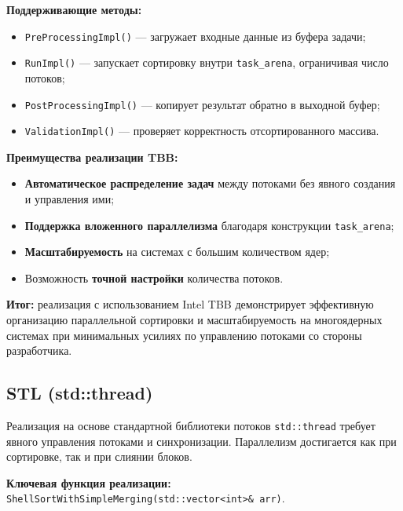 \documentclass[12pt]{article}
\begin{document}
\textbf{Поддерживающие методы:}
\begin{itemize}
  \item \texttt{PreProcessingImpl()} — загружает входные данные из буфера задачи;
  \item \texttt{RunImpl()} — запускает сортировку внутри \texttt{task\_arena}, ограничивая число потоков;
  \item \texttt{PostProcessingImpl()} — копирует результат обратно в выходной буфер;
  \item \texttt{ValidationImpl()} — проверяет корректность отсортированного массива.
\end{itemize}

\textbf{Преимущества реализации TBB:}
\begin{itemize}
  \item \textbf{Автоматическое распределение задач} между потоками без явного создания и управления ими;
  \item \textbf{Поддержка вложенного параллелизма} благодаря конструкции \texttt{task\_arena};
  \item \textbf{Масштабируемость} на системах с большим количеством ядер;
  \item Возможность \textbf{точной настройки} количества потоков.
\end{itemize}

\textbf{Итог:} реализация с использованием Intel TBB демонстрирует эффективную организацию параллельной сортировки и масштабируемость на многоядерных системах при минимальных усилиях по управлению потоками со стороны разработчика.


\subsection{STL (std::thread)}

Реализация на основе стандартной библиотеки потоков \texttt{std::thread} требует явного управления потоками и синхронизации. Параллелизм достигается как при сортировке, так и при слиянии блоков.

\textbf{Ключевая функция реализации:} \texttt{ShellSortWithSimpleMerging(std::vector<int>\& arr)}.
\end{document}
